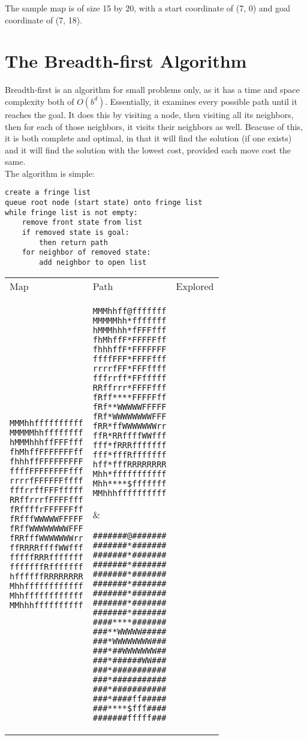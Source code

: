 \documentclass[12pt, article]{scrartcl}
\begin{document}
The sample map is of size 15 by 20, with a start coordinate of (7, 0) and goal coordinate of (7, 18). \\

\section{The Breadth-first Algorithm}
Breadth-first is an algorithm for small problems only, as it has a time and space complexity both of $O(b^{d})$. Essentially, it examines every possible path until it reaches the goal. It does this by visiting a node, then visiting all its neighbors, then for each of those neighbors, it visits their neighbors as well. Beacuse of this, it is both complete and optimal, in that it will find the solution (if one exists) and it will find the solution with the lowest cost, provided each move cost the same. \\

The algorithm is simple: 

\begin{verbatim}
create a fringe list
queue root node (start state) onto fringe list
while fringe list is not empty:
    remove front state from list
    if removed state is goal:
        then return path
    for neighbor of removed state:
        add neighbor to open list
\end{verbatim}

\begin{tabular}{p{2in} p{2in} p{2in}}
Map & Path & Explored \\
\begin{verbatim}
MMMhhffffffffff
MMMMMhhffffffff
hMMMhhhffFFFfff
fhMhffFFFFFFFff
fhhhffFFFFFFFFF
ffffFFFFFFFFfff
rrrrfFFFFFFffff
fffrrffFFFfffff
RRffrrrfFFFFfff
fRffffrFFFFFFff
fRfffWWWWWFFFFF
fRffWWWWWWWWFFF
fRRfffWWWWWWWrr
ffRRRRffffWWfff
fffffRRRfffffff
fffffffRfffffff
hffffffRRRRRRRR
Mhhffffffffffff
Mhhffffffffffff
MMhhhffffffffff
\end{verbatim}
&
\begin{verbatim}
MMMhhff@fffffff
MMMMMhh*fffffff
hMMMhhh*fFFFfff
fhMhffF*FFFFFff
fhhhffF*FFFFFFF
ffffFFF*FFFFfff
rrrrfFF*FFFffff
fffrrff*FFfffff
RRffrrr*FFFFfff
fRff****FFFFFff
fRf**WWWWWFFFFF
fRf*WWWWWWWWFFF
fRR*ffWWWWWWWrr
ffR*RRffffWWfff
fff*fRRRfffffff
fff*fffRfffffff
hff*fffRRRRRRRR
Mhh*fffffffffff
Mhh****$fffffff
MMhhhffffffffff
\end{verbatim}
&
\begin{verbatim}
#######@#######
#######*#######
#######*#######
#######*#######
#######*#######
#######*#######
#######*#######
#######*#######
#######*#######
####****#######
###**WWWWW#####
###*WWWWWWWW###
###*##WWWWWWW##
###*######WW###
###*###########
###*###########
###*###########
###*####ff#####
###****$fff####
#######fffff###
\end{verbatim}
\end{tabular}
\end{document}
